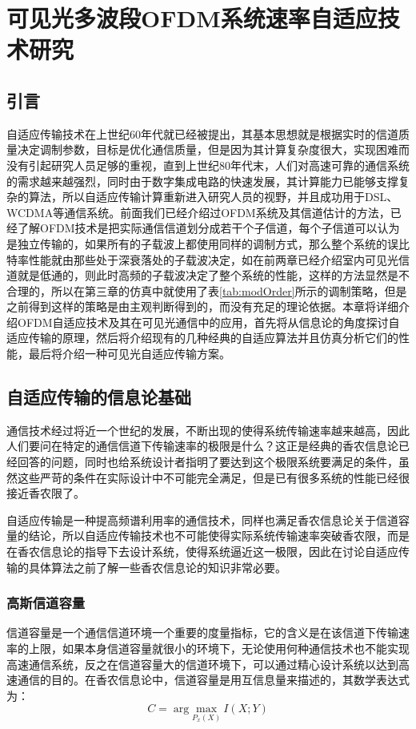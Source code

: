 \chapter{可见光多波段OFDM系统速率自适应技术研究}
\section{引言}
自适应传输技术在上世纪60年代就已经被提出，其基本思想就是根据实时的信道质量决定调制参数，目标是优化通信质量，但是因为其计算复杂度很大，实现困难而没有引起研究人员足够的重视\cite{徐凌峰2007ofdm}，直到上世纪80年代末，人们对高速可靠的通信系统的需求越来越强烈，同时由于数字集成电路的快速发展，其计算能力已能够支撑复杂的算法，所以自适应传输计算重新进入研究人员的视野，并且成功用于DSL、WCDMA等通信系统。前面我们已经介绍过OFDM系统及其信道估计的方法，已经了解OFDM技术是把实际通信信道划分成若干个子信道，每个子信道可以认为是独立传输的，如果所有的子载波上都使用同样的调制方式，那么整个系统的误比特率性能就由那些处于深衰落处的子载波决定，如在前两章已经介绍室内可见光信道就是低通的，则此时高频的子载波决定了整个系统的性能，这样的方法显然是不合理的，所以在第三章的仿真中就使用了表\ref{tab:modOrder}所示的调制策略，但是之前得到这样的策略是由主观判断得到的，而没有充足的理论依据。本章将详细介绍OFDM自适应技术及其在可见光通信中的应用，首先将从信息论的角度探讨自适应传输的原理，然后将介绍现有的几种经典的自适应算法并且仿真分析它们的性能，最后将介绍一种可见光自适应传输方案。
\section{自适应传输的信息论基础}
通信技术经过将近一个世纪的发展，不断出现的使得系统传输速率越来越高，因此人们要问在特定的通信信道下传输速率的极限是什么？这正是经典的香农信息论已经回答的问题，同时也给系统设计者指明了要达到这个极限系统要满足的条件，虽然这些严苛的条件在实际设计中不可能完全满足，但是已有很多系统的性能已经很接近香农限了。

自适应传输是一种提高频谱利用率的通信技术，同样也满足香农信息论关于信道容量的结论，所以自适应传输技术也不可能使得实际系统传输速率突破香农限，而是在香农信息论的指导下去设计系统，使得系统逼近这一极限，因此在讨论自适应传输的具体算法之前了解一些香农信息论的知识非常必要。
\subsection{高斯信道容量}
信道容量是一个通信信道环境一个重要的度量指标，它的含义是在该信道下传输速率的上限，如果本身信道容量就很小的环境下，无论使用何种通信技术也不能实现高速通信系统，反之在信道容量大的信道环境下，可以通过精心设计系统以达到高速通信的目的。在香农信息论中，信道容量是用互信息量来描述的，其数学表达式为：
\begin{equation}
C = \arg \underset{P_x(X)}{\text{max}} \ I(X;Y)
\end{equation}

